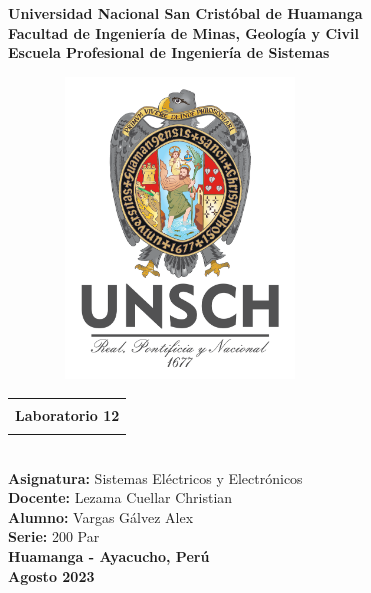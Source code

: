 \begin{titlepage}
	\begin{center}
		{\LARGE\textbf{Universidad Nacional San Cristóbal de Huamanga}}\\
		\vspace{0.5cm}
		{\LARGE\textbf{Facultad de Ingeniería de Minas, Geología y Civil}}\\
		\vspace{0.5cm}
		{\LARGE\textbf{Escuela Profesional de Ingeniería de Sistemas}}\\
		\vspace{1cm}
		\begin{figure}[h]
			\centering
			\includegraphics[width=7cm, height=8cm]{imagenes/logo}
		\end{figure}
		\vspace{0.75cm}
		\begin{tabular}{|c|}
			\hline
			\\
			{\Large\textbf{ Laboratorio 12  }}\\
			\\
			\hline
		\end{tabular}\\
		\vspace{0.75cm}
		{\Large\textbf{Asignatura: } Sistemas Eléctricos y Electrónicos}\\
		\vspace{0.75cm}
		{\Large\textbf{Docente: } Lezama Cuellar Christian}\\
		\vspace{0.75cm}
		{\Large\textbf{Alumno: }Vargas Gálvez Alex}\\
		\vspace{0.75cm}
		{\large\textbf{Serie: }200 Par}\\
		\vspace{ 1.5cm}
		{\huge \textbf{Huamanga - Ayacucho, Perú}}\\
		\vspace{1cm}
		{\huge \textbf{Agosto 2023}}
	\end{center}
\end{titlepage}